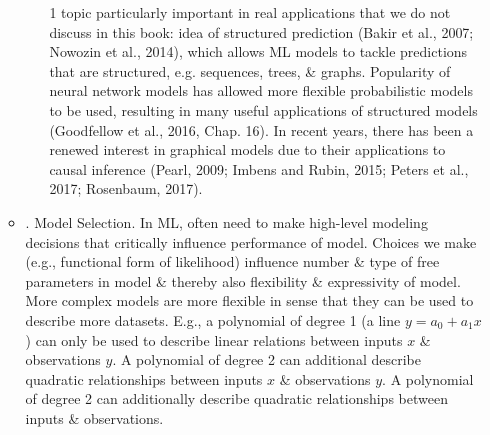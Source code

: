 \documentclass{article}
\begin{document}
\begin{itemize}
\begin{itemize}
\begin{itemize}
			1 topic particularly important in real applications that we do not discuss in this book: idea of structured prediction (Bakir et al., 2007; Nowozin et al., 2014), which allows ML models to tackle predictions that are structured, e.g. sequences, trees, \& graphs. Popularity of neural network models has allowed more flexible probabilistic models to be used, resulting in many useful applications of structured models (Goodfellow et al., 2016, Chap. 16). In recent years, there has been a renewed interest in graphical models due to their applications to causal inference (Pearl, 2009; Imbens and Rubin, 2015; Peters et al., 2017; Rosenbaum, 2017).
		\end{itemize}
		\item {. Model Selection.} In ML, often need to make high-level modeling decisions that critically influence performance of model. Choices we make (e.g., functional form of likelihood) influence number \& type of free parameters in model \& thereby also flexibility \& expressivity of model. More complex models are more flexible in sense that they can be used to describe more datasets. E.g., a polynomial of degree 1 (a line $y = a_0 + a_1x$) can only be used to describe linear relations between inputs $x$ \& observations $y$. A polynomial of degree 2 can additional describe quadratic relationships between inputs $x$ \& observations $y$. A polynomial of degree 2 can additionally describe quadratic relationships between inputs \& observations.
		

\end{itemize}
\end{itemize}
\end{document}
